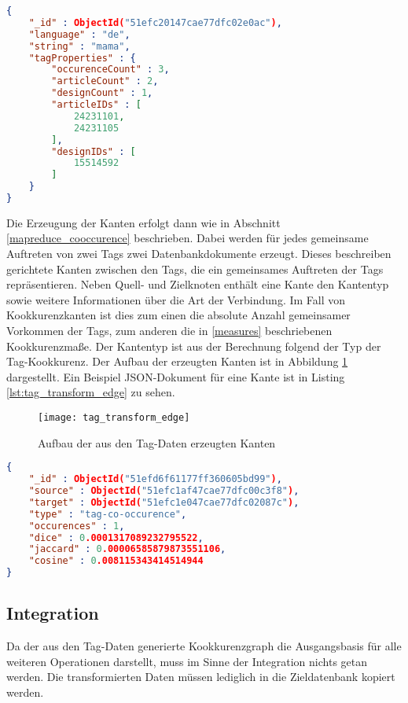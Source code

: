 \begin{lstlisting}[language=json, label={lst:tag_transform_node}, caption={Tag-Knoten als JSON-Dokument}]
{
    "_id" : ObjectId("51efc20147cae77dfc02e0ac"),
    "language" : "de",
    "string" : "mama",
    "tagProperties" : {
        "occurenceCount" : 3,
        "articleCount" : 2,
        "designCount" : 1,
        "articleIDs" : [
            24231101,
            24231105
        ],
        "designIDs" : [
            15514592
        ]
    }
}
\end{lstlisting}

Die Erzeugung der Kanten erfolgt dann wie in Abschnitt \ref{mapreduce_cooccurence} beschrieben. Dabei werden für jedes gemeinsame Auftreten von zwei Tags zwei Datenbankdokumente erzeugt. Dieses beschreiben gerichtete Kanten zwischen den Tags, die ein gemeinsames Auftreten der Tags repräsentieren. Neben Quell- und Zielknoten enthält eine Kante den Kantentyp sowie weitere Informationen über die Art der Verbindung. Im Fall von Kookkurenzkanten ist dies zum einen die absolute Anzahl gemeinsamer Vorkommen der Tags, zum anderen die in \ref{measures} beschriebenen Kookkurenzmaße. Der Kantentyp ist aus der Berechnung folgend der Typ der Tag-Kookkurenz. Der Aufbau der erzeugten Kanten ist in Abbildung \ref{fig:tag_transform_edge} dargestellt. Ein Beispiel JSON-Dokument für eine Kante ist in Listing \ref{lst:tag_transform_edge} zu sehen.

\begin{figure}
\centering
\texttt{[image: tag\_transform\_edge]}
\caption{Aufbau der aus den Tag-Daten erzeugten Kanten}
\label{fig:tag_transform_edge}
\end{figure}

\begin{lstlisting}[language=json, label={lst:tag_transform_edge}, caption={Tag-Kante als JSON-Dokument}]
{
    "_id" : ObjectId("51efd6f61177ff360605bd99"),
    "source" : ObjectId("51efc1af47cae77dfc00c3f8"),
    "target" : ObjectId("51efc1e047cae77dfc02087c"),
    "type" : "tag-co-occurence",
    "occurences" : 1,
    "dice" : 0.0001317089232795522,
    "jaccard" : 0.00006585879873551106,
    "cosine" : 0.008115343414514944
}
\end{lstlisting}

\subsection{Integration}

Da der aus den Tag-Daten generierte Kookkurenzgraph die Ausgangsbasis für alle weiteren Operationen darstellt, muss im Sinne der Integration nichts getan werden. Die transformierten Daten müssen lediglich in die Zieldatenbank kopiert werden.


